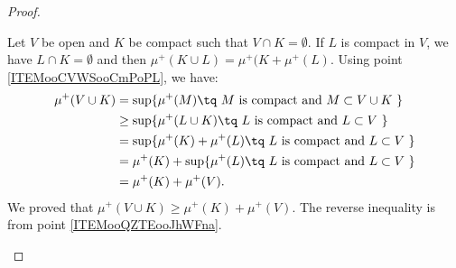 \begin{proof}
\begin{subproof}
		Let \( V\) be open and \( K\) be compact such that \( V\cap K=\emptyset\). If \( L\) is compact in \( V\), we have \( L\cap K=\emptyset \) and then \( \mu^+(K\cup L)=\mu^+(K+\mu^+(L)\). Using point \ref{ITEMooCVWSooCmPoPL}, we have:
		\begin{subequations}
			\begin{align}
				\mu^+(V\cup K) & =\sup\{ \mu^+(M)\tq \text{  \( M\) is compact and \( M\subset V\cup K\) } \}      \\
				               & \geq \sup\{ \mu^+(L\cup K)\tq \text{ \( L\) is compact and \( L\subset V\) } \}   \\
				               & =\sup\{ \mu^+(K)+\mu^+(L)  \tq \text{ \( L\) is compact and \( L\subset V\) } \}  \\
				               & = \mu^+(K)+ \sup\{\mu^+(L)  \tq \text{ \( L\) is compact and \( L\subset V\) } \} \\
				               & =\mu^+(K)+\mu^+(V).
			\end{align}
		\end{subequations}
		We proved that \( \mu^+(V\cup K)\geq \mu^+(K)+\mu^+(V)\). The reverse inequality is from point \ref{ITEMooQZTEooJhWFna}.

		     \label{ITEMooMWJBooCHUrot}


\end{subproof}
\end{proof}
